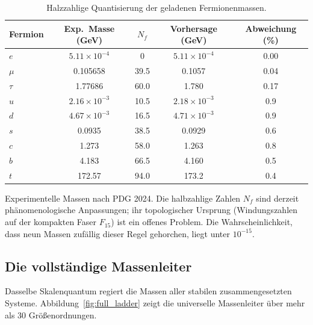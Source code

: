 \documentclass[12pt,a4paper]{article}
\theoremstyle{remark}
\begin{document}
	\begin{table}[htbp]
		\centering
		\caption{Halzzahlige Quantisierung der geladenen Fermionenmassen.}
		\label{tab:fermions}
		\small
		\begin{tabular}{l c c c c}
			\toprule
			Fermion & Exp.\ Masse (GeV) & \(N_f\) & Vorhersage (GeV) & Abweichung (\%) \\
			\midrule
			\(e\)   & \(5.11\times10^{-4}\) & 0      & \(5.11\times10^{-4}\) & 0.00 \\
			\(\mu\)  & 0.105658             & 39.5   & 0.1057               & 0.04 \\
			\(\tau\) & 1.77686              & 60.0   & 1.780                & 0.17 \\
			\(u\)   & \(2.16\times10^{-3}\) & 10.5   & \(2.18\times10^{-3}\) & 0.9 \\
			\(d\)   & \(4.67\times10^{-3}\) & 16.5   & \(4.71\times10^{-3}\) & 0.9 \\
			\(s\)   & 0.0935               & 38.5   & 0.0929               & 0.6 \\
			\(c\)   & 1.273                & 58.0   & 1.263                & 0.8 \\
			\(b\)   & 4.183                & 66.5   & 4.160                & 0.5 \\
			\(t\)   & 172.57               & 94.0   & 173.2                & 0.4 \\
			\bottomrule
		\end{tabular}
		\par\smallskip
		\footnotesize
		Experimentelle Massen nach PDG 2024. Die halbzahlige Zahlen \(N_f\) sind
		derzeit phänomenologische Anpassungen; ihr topologischer Ursprung
		(Windungszahlen auf der kompakten Faser \(F_{15}\)) ist ein offenes Problem.
		Die Wahrscheinlichkeit, dass neun Massen zufällig dieser Regel gehorchen,
		liegt unter \(10^{-15}\).
	\end{table}
	
	\subsection{Die vollständige Massenleiter}
	
	Dasselbe Skalenquantum regiert die Massen aller stabilen zusammengesetzten
	Systeme. Abbildung~\ref{fig:full_ladder} zeigt die universelle Massenleiter
	über mehr als 30 Größenordnungen.
	
\end{document}
